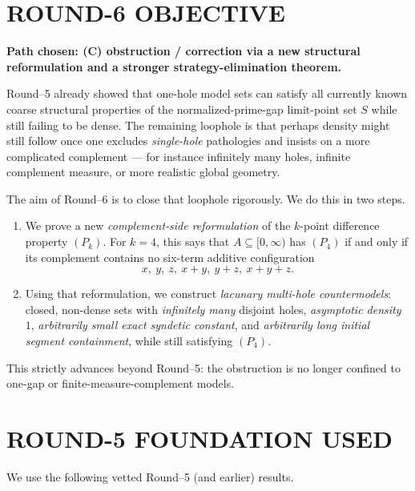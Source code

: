 \section{ROUND-6 OBJECTIVE}

\textbf{Path chosen: (C) obstruction / correction via a new structural reformulation and a stronger strategy-elimination theorem.}

Round--5 already showed that one-hole model sets can satisfy all currently known coarse structural properties of the normalized-prime-gap limit-point set $S$ while still failing to be dense. The remaining loophole is that perhaps density might still follow once one excludes \emph{single-hole} pathologies and insists on a more complicated complement --- for instance infinitely many holes, infinite complement measure, or more realistic global geometry.

The aim of Round--6 is to close that loophole rigorously. We do this in two steps.

\begin{enumerate}
\item We prove a new \emph{complement-side reformulation} of the $k$-point difference property $(P_k)$. For $k=4$, this says that $A\subseteq[0,\infty)$ has $(P_4)$ if and only if its complement contains no six-term additive configuration
\[
 x,\ y,\ z,\ x+y,\ y+z,\ x+y+z.
\]
\item Using that reformulation, we construct \emph{lacunary multi-hole countermodels}: closed, non-dense sets with \emph{infinitely many} disjoint holes, \emph{asymptotic density $1$}, \emph{arbitrarily small exact syndetic constant}, and \emph{arbitrarily long initial segment containment}, while still satisfying $(P_4)$.
\end{enumerate}

This strictly advances beyond Round--5: the obstruction is no longer confined to one-gap or finite-measure-complement models.


\section{ROUND-5 FOUNDATION USED}

We use the following vetted Round--5 (and earlier) results.

